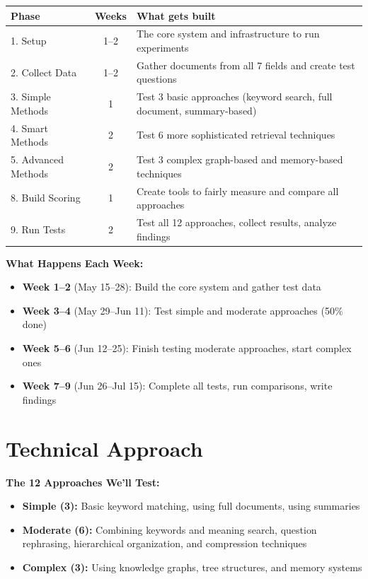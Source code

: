 \documentclass[11pt,a4paper]{article}
\begin{document}
\begin{table}[h]
\centering
\small
\begin{tabularx}{\textwidth}{l|c|X}
\toprule
\textbf{Phase} & \textbf{Weeks} & \textbf{What gets built} \\
\midrule
1. Setup & 1--2 & The core system and infrastructure to run experiments \\
2. Collect Data & 1--2 & Gather documents from all 7 fields and create test questions \\
3. Simple Methods & 1 & Test 3 basic approaches (keyword search, full document, summary-based) \\
4. Smart Methods & 2 & Test 6 more sophisticated retrieval techniques \\
5. Advanced Methods & 2 & Test 3 complex graph-based and memory-based techniques \\
8. Build Scoring & 1 & Create tools to fairly measure and compare all approaches \\
9. Run Tests & 2 & Test all 12 approaches, collect results, analyze findings \\
\bottomrule
\end{tabularx}
\end{table}

\noindent
\textbf{What Happens Each Week:}
\begin{itemize}\setlength{\itemsep}{2pt}
    \item \textbf{Week 1--2} (May 15--28): Build the core system and gather test data
    \item \textbf{Week 3--4} (May 29--Jun 11): Test simple and moderate approaches (50\% done)
    \item \textbf{Week 5--6} (Jun 12--25): Finish testing moderate approaches, start complex ones
    \item \textbf{Week 7--9} (Jun 26--Jul 15): Complete all tests, run comparisons, write findings
\end{itemize}

\section*{Technical Approach}

\textbf{The 12 Approaches We'll Test:}
\begin{itemize}\setlength{\itemsep}{0pt}
    \item \textbf{Simple (3):} Basic keyword matching, using full documents, using summaries
    \item \textbf{Moderate (6):} Combining keywords and meaning search, question rephrasing, hierarchical organization, and compression techniques
    \item \textbf{Complex (3):} Using knowledge graphs, tree structures, and memory systems
\end{itemize}
\end{document}
